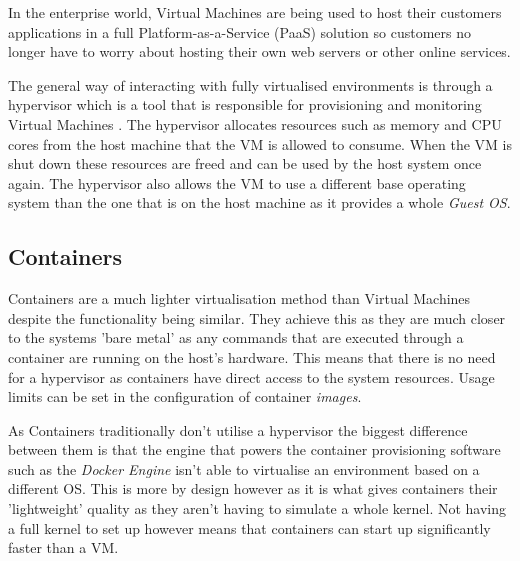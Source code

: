 In the enterprise world, Virtual Machines are being used to host their customers applications in a full Platform-as-a-Service (PaaS) solution so customers no longer have to worry about hosting their own web servers or other online services. %

The general way of interacting with fully virtualised environments is through a hypervisor which is a tool that is responsible for provisioning and monitoring Virtual Machines \cite{hypervisor}. The hypervisor allocates resources such as memory and CPU cores from the host machine that the VM is allowed to consume. When the VM is shut down these resources are freed and can be used by the host system once again. The hypervisor also allows the VM to use a different base operating system than the one that is on the host machine as it provides a whole \textit{Guest OS}.

\subsection{Containers}

Containers are a much lighter virtualisation method than  Virtual Machines despite the functionality being similar. They achieve this as they are much closer to the systems 'bare metal' as any commands that are executed through a container are running on the host's hardware. This means that there is no need for a hypervisor as containers have direct access to the system resources. Usage limits can be set in the configuration of container \textit{images}.

As Containers traditionally don't utilise a hypervisor the biggest difference between them is that the engine that powers the container provisioning software such as the \textit{Docker Engine} isn't able to virtualise an environment based on a different OS. This is more by design however as it is what gives containers their 'lightweight' quality as they aren't having to simulate a whole kernel. Not having a full kernel to set up however means that containers can start up significantly faster than a VM.

